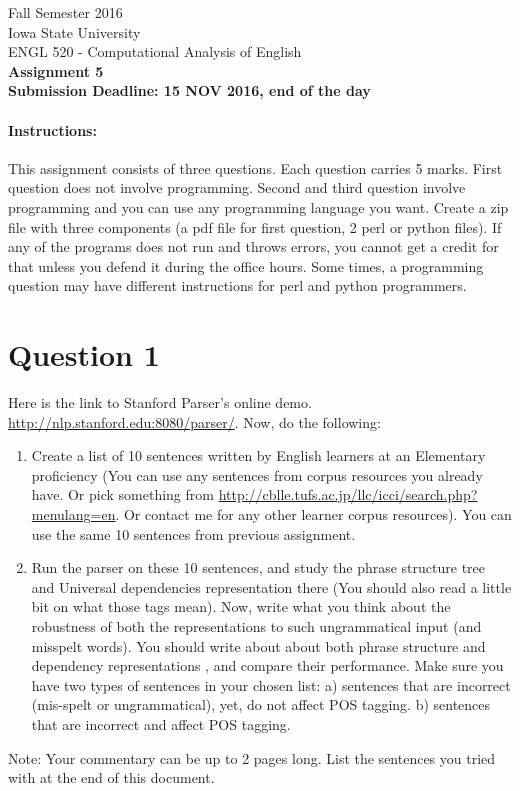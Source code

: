 \documentclass[11pt,a4paper]{article}
\begin{document}
\begin{center}
  Fall Semester 2016 \\ Iowa State University\\[3ex]
  {\large ENGL 520 - Computational Analysis of English}\\[3ex]
  \textbf{Assignment 5} \\ \textbf{Submission Deadline: 15 NOV 2016, end of the day}
\end{center}


\paragraph{Instructions:} This assignment consists of three questions. Each question carries 5 marks. First question does not involve programming. Second and third question involve programming and you can use any programming language you want. Create a zip file with three components (a pdf file for first question, 2 perl or python files). If any of the programs does not run and throws errors, you cannot get a credit for that unless you defend it during the office hours. Some times, a programming question may have different instructions for perl and python programmers.

\section*{Question 1} 
Here is the link to Stanford Parser's online demo. \url{http://nlp.stanford.edu:8080/parser/}. Now, do the following:
\begin{enumerate}
\item Create a list of 10 sentences written by English learners at an Elementary proficiency (You can use any sentences from corpus resources you already have. Or pick something from \url{http://cblle.tufs.ac.jp/llc/icci/search.php?menulang=en}. Or contact me for any other learner corpus resources). You can use the same 10 sentences from previous assignment.
\item Run the parser on these 10 sentences, and study the phrase structure tree and Universal dependencies representation there (You should also read a little bit on what those tags mean). Now, write what you think about the robustness of both the representations to such ungrammatical input (and misspelt words). You should write about about both phrase structure and dependency representations , and compare their performance. Make sure you have two types of sentences in your chosen list: a) sentences that are incorrect (mis-spelt or ungrammatical), yet, do not affect POS tagging. b) sentences that are incorrect and affect POS tagging.
\end{enumerate}
Note: Your commentary can be up to 2 pages long. List the sentences you tried with at the end of this document. 
\end{document}
